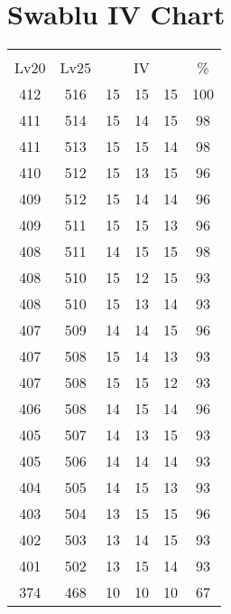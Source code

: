 \documentclass{article}%
\begin{document}
%
\normalsize%
\section{Swablu IV Chart}%
\label{sec:Swablu IV Chart}%
\renewcommand{\arraystretch}{1.5}%
\begin{tabular}{|c|c|c|c|c|c|}%
\hline%
\multicolumn{6}{|c|}{\textcolor{white}{ 
\linebreak{Swablu}
}%
\cellcolor{black}}\\%
\multicolumn{1}{|c}{Lv20}&\multicolumn{1}{c|}{Lv25}&\multicolumn{3}{c|}{IV}&\multicolumn{1}{|c|}{\%}\\%
\hline%
\rowcolor{color100}%
412&516&15&15&15&100\\%
\hline%
\rowcolor{color98}%
411&514&15&14&15&98\\%
\hline%
\rowcolor{color98}%
411&513&15&15&14&98\\%
\hline%
\rowcolor{color96}%
410&512&15&13&15&96\\%
\hline%
\rowcolor{color96}%
409&512&15&14&14&96\\%
\hline%
\rowcolor{color96}%
409&511&15&15&13&96\\%
\hline%
\rowcolor{color98}%
408&511&14&15&15&98\\%
\hline%
\rowcolor{color93}%
408&510&15&12&15&93\\%
\hline%
\rowcolor{color93}%
408&510&15&13&14&93\\%
\hline%
\rowcolor{color96}%
407&509&14&14&15&96\\%
\hline%
\rowcolor{color93}%
407&508&15&14&13&93\\%
\hline%
\rowcolor{color93}%
407&508&15&15&12&93\\%
\hline%
\rowcolor{color96}%
406&508&14&15&14&96\\%
\hline%
\rowcolor{color93}%
405&507&14&13&15&93\\%
\hline%
\rowcolor{color93}%
405&506&14&14&14&93\\%
\hline%
\rowcolor{color93}%
404&505&14&15&13&93\\%
\hline%
\rowcolor{color96}%
403&504&13&15&15&96\\%
\hline%
\rowcolor{color93}%
402&503&13&14&15&93\\%
\hline%
\rowcolor{color93}%
401&502&13&15&14&93\\%
\hline%
\rowcolor{color91}%
374&468&10&10&10&67\\%
\end{tabular}

%
\end{document}
